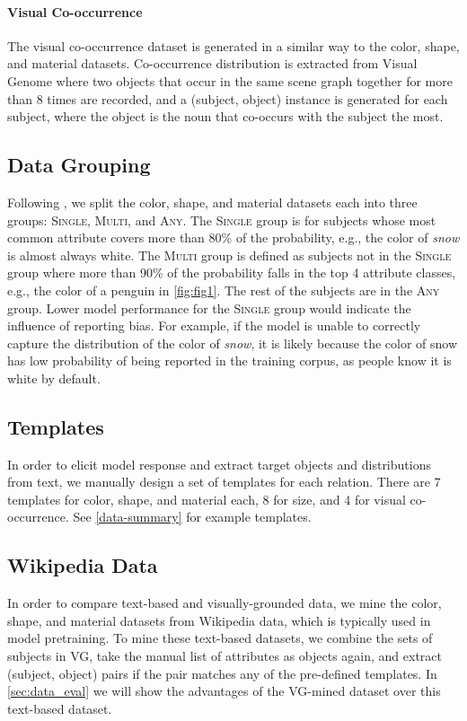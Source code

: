 \documentclass[11pt]{article}
\newcommand{\Single}{{\scshape Single}}
\newcommand{\Multi}{{\scshape Multi}}
\newcommand{\Any}{{\scshape Any}}
\begin{document}
\paragraph{Visual Co-occurrence}
The visual co-occurrence dataset is generated in a similar way to the color, shape, and material datasets. Co-occurrence distribution is extracted from Visual Genome where two objects that occur in the same scene graph together for more than 8 times are recorded, and a (subject, object) instance is generated for each subject, where the object is the noun that co-occurs with the subject the most.



\subsection{Data Grouping}
Following \citet{paik-etal-2021-world}, we split the color, shape, and material datasets each into three groups: \Single{}, \Multi{}, and \Any{}. The \Single{} group is for subjects whose most common attribute covers more than 80\% of the probability, e.g., the color of \emph{snow} is almost always white. The \Multi{} group is defined as subjects not in the \Single{} group where more than 90\% of the probability falls in the top 4 attribute classes, e.g., the color of a penguin in \cref{fig:fig1}. The rest of the subjects are in the \Any{} group. Lower model performance for the \Single{} group would indicate the influence of reporting bias. For example, if the model is unable to correctly capture the distribution of the color of \emph{snow}, it is likely because the color of snow has low probability of being reported in the training corpus, as people know it is white by default.

\subsection{Templates}
In order to elicit model response and extract target objects and distributions from text, we manually design a set of templates for each relation. There are 7 templates for color, shape, and material each, 8 for size, and 4 for visual co-occurrence.
See \cref{data-summary} for example templates.

\subsection{Wikipedia Data}
In order to compare text-based and visually-grounded data, we mine the color, shape, and material datasets from Wikipedia data, which is typically used in model pretraining. 
To mine these text-based datasets, we combine the sets of subjects in VG, take the manual list of attributes as objects again, and extract (subject, object) pairs if the pair matches any of the pre-defined templates. In \cref{sec:data_eval} we will show the advantages of the VG-mined dataset over this text-based dataset.
\end{document}
